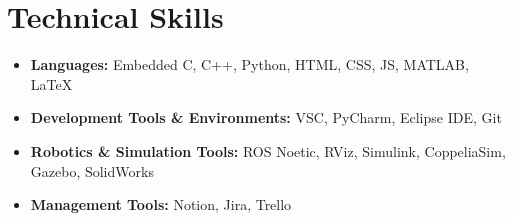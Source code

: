\section*{Technical Skills}
%
%
%
\begin{itemize}
	\item \textbf{Languages:} Embedded C, C++, Python, HTML, CSS, JS, MATLAB, LaTeX
	\item \textbf{Development Tools \& Environments:} VSC, PyCharm, Eclipse IDE, Git
	\item \textbf{Robotics \& Simulation Tools:} ROS Noetic, RViz, Simulink, CoppeliaSim, Gazebo, SolidWorks
	\item \textbf{Management Tools:} Notion, Jira, Trello
\end{itemize}
